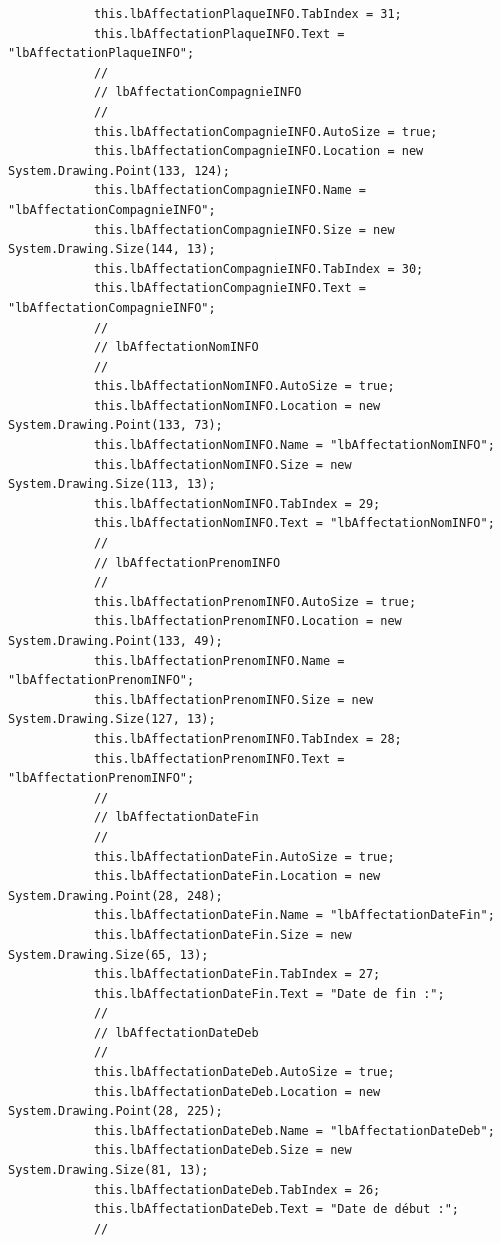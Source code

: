 \documentclass[main.tex]{subfiles}
\begin{document}
\begin{lstlisting}
            this.lbAffectationPlaqueINFO.TabIndex = 31;
            this.lbAffectationPlaqueINFO.Text = "lbAffectationPlaqueINFO";
            // 
            // lbAffectationCompagnieINFO
            // 
            this.lbAffectationCompagnieINFO.AutoSize = true;
            this.lbAffectationCompagnieINFO.Location = new System.Drawing.Point(133, 124);
            this.lbAffectationCompagnieINFO.Name = "lbAffectationCompagnieINFO";
            this.lbAffectationCompagnieINFO.Size = new System.Drawing.Size(144, 13);
            this.lbAffectationCompagnieINFO.TabIndex = 30;
            this.lbAffectationCompagnieINFO.Text = "lbAffectationCompagnieINFO";
            // 
            // lbAffectationNomINFO
            // 
            this.lbAffectationNomINFO.AutoSize = true;
            this.lbAffectationNomINFO.Location = new System.Drawing.Point(133, 73);
            this.lbAffectationNomINFO.Name = "lbAffectationNomINFO";
            this.lbAffectationNomINFO.Size = new System.Drawing.Size(113, 13);
            this.lbAffectationNomINFO.TabIndex = 29;
            this.lbAffectationNomINFO.Text = "lbAffectationNomINFO";
            // 
            // lbAffectationPrenomINFO
            // 
            this.lbAffectationPrenomINFO.AutoSize = true;
            this.lbAffectationPrenomINFO.Location = new System.Drawing.Point(133, 49);
            this.lbAffectationPrenomINFO.Name = "lbAffectationPrenomINFO";
            this.lbAffectationPrenomINFO.Size = new System.Drawing.Size(127, 13);
            this.lbAffectationPrenomINFO.TabIndex = 28;
            this.lbAffectationPrenomINFO.Text = "lbAffectationPrenomINFO";
            // 
            // lbAffectationDateFin
            // 
            this.lbAffectationDateFin.AutoSize = true;
            this.lbAffectationDateFin.Location = new System.Drawing.Point(28, 248);
            this.lbAffectationDateFin.Name = "lbAffectationDateFin";
            this.lbAffectationDateFin.Size = new System.Drawing.Size(65, 13);
            this.lbAffectationDateFin.TabIndex = 27;
            this.lbAffectationDateFin.Text = "Date de fin :";
            // 
            // lbAffectationDateDeb
            // 
            this.lbAffectationDateDeb.AutoSize = true;
            this.lbAffectationDateDeb.Location = new System.Drawing.Point(28, 225);
            this.lbAffectationDateDeb.Name = "lbAffectationDateDeb";
            this.lbAffectationDateDeb.Size = new System.Drawing.Size(81, 13);
            this.lbAffectationDateDeb.TabIndex = 26;
            this.lbAffectationDateDeb.Text = "Date de début :";
            // 

\end{lstlisting}
\end{document}
